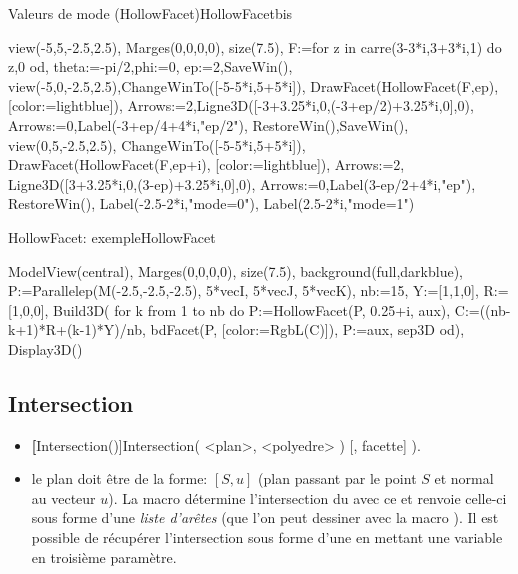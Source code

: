 \begin{demo}{Valeurs de mode (HollowFacet)}{HollowFacetbis}
\begin{texgraph}[name=HollowFacetbis]
view(-5,5,-2.5,2.5), Marges(0,0,0,0), size(7.5),
F:=for z in carre(3-3*i,3+3*i,1) do z,0 od,
theta:=-pi/2,phi:=0, ep:=2,SaveWin(),
view(-5,0,-2.5,2.5),ChangeWinTo([-5-5*i,5+5*i]),
DrawFacet(HollowFacet(F,ep), [color:=lightblue]),
Arrows:=2,Ligne3D([-3+3.25*i,0,(-3+ep/2)+3.25*i,0],0),
Arrows:=0,Label(-3+ep/4+4*i,"ep/2"),
RestoreWin(),SaveWin(),
view(0,5,-2.5,2.5), ChangeWinTo([-5-5*i,5+5*i]),
DrawFacet(HollowFacet(F,ep+i), [color:=lightblue]),
Arrows:=2, Ligne3D([3+3.25*i,0,(3-ep)+3.25*i,0],0),
Arrows:=0,Label(3-ep/2+4*i,"ep"),
RestoreWin(),
Label(-2.5-2*i,"mode=0"), Label(2.5-2*i,"mode=1") 
\end{texgraph}
\end{demo}


\begin{demo}{HollowFacet: exemple}{HollowFacet}
\begin{texgraph}[name=HollowFacet]
ModelView(central), Marges(0,0,0,0), size(7.5),
background(full,darkblue),
P:=Parallelep(M(-2.5,-2.5,-2.5), 5*vecI, 
       5*vecJ, 5*vecK), nb:=15,
Y:=[1,1,0], R:=[1,0,0],
Build3D(
  for k from 1 to nb do
   P:=HollowFacet(P, 0.25+i, aux),
   C:=((nb-k+1)*R+(k-1)*Y)/nb,
   bdFacet(P, [color:=RgbL(C)]),
   P:=aux, sep3D
  od),
Display3D()
\end{texgraph}
\end{demo}


\subsection{Intersection}
\begin{itemize}
 \item \util \textbf[Intersection()]{Intersection( <plan>, <polyedre> ) [, facette] )}.
 \item \desc le plan doit être de la forme: $[S,u]$ (plan passant par le point $S$ et normal au vecteur $u$). La macro détermine l'intersection du  avec ce  et renvoie celle-ci sous forme d'une \textsl{liste d'arêtes} (que l'on peut dessiner avec la macro ). Il est possible de récupérer l'intersection sous forme d'une  en mettant une variable en troisième paramètre.
\end{itemize}

